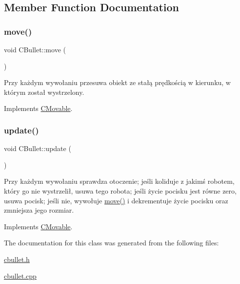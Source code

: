 \subsection{Member Function Documentation}
\mbox{\label{class_c_bullet_a693e95f219a9a642e3977bb48be0cf5d}} 
\subsubsection{\texorpdfstring{move()}{move()}}
{\footnotesize\ttfamily void C\+Bullet\+::move (\begin{DoxyParamCaption}{ }\end{DoxyParamCaption})\hspace{0.3cm}{\ttfamily [virtual]}}



Przy każdym wywołaniu przesuwa obiekt ze stałą prędkością w kierunku, w którym został wystrzelony. 



Implements \mbox{\hyperlink{class_c_movable_a8e66e106f13362d24462ce0c9d0431af}{C\+Movable}}.

\mbox{\label{class_c_bullet_a9685917f7fc76d417e03744223b1b2c6}} 
\subsubsection{\texorpdfstring{update()}{update()}}
{\footnotesize\ttfamily void C\+Bullet\+::update (\begin{DoxyParamCaption}{ }\end{DoxyParamCaption})\hspace{0.3cm}{\ttfamily [virtual]}}



Przy każdym wywołaniu sprawdza otoczenie; jeśli koliduje z jakimś robotem, który go nie wystrzelił, usuwa tego robota; jeśli życie pocisku jest równe zero, usuwa pocisk; jeśli nie, wywołuje \mbox{\hyperlink{class_c_bullet_a693e95f219a9a642e3977bb48be0cf5d}{move()}} i dekrementuje życie pocisku oraz zmniejsza jego rozmiar. 



Implements \mbox{\hyperlink{class_c_movable_af45fc62960d86ef62949d078141e9d62}{C\+Movable}}.



The documentation for this class was generated from the following files\+:\begin{DoxyCompactItemize}
\item 
\mbox{\hyperlink{cbullet_8h}{cbullet.\+h}}\item 
\mbox{\hyperlink{cbullet_8cpp}{cbullet.\+cpp}}\end{DoxyCompactItemize}
